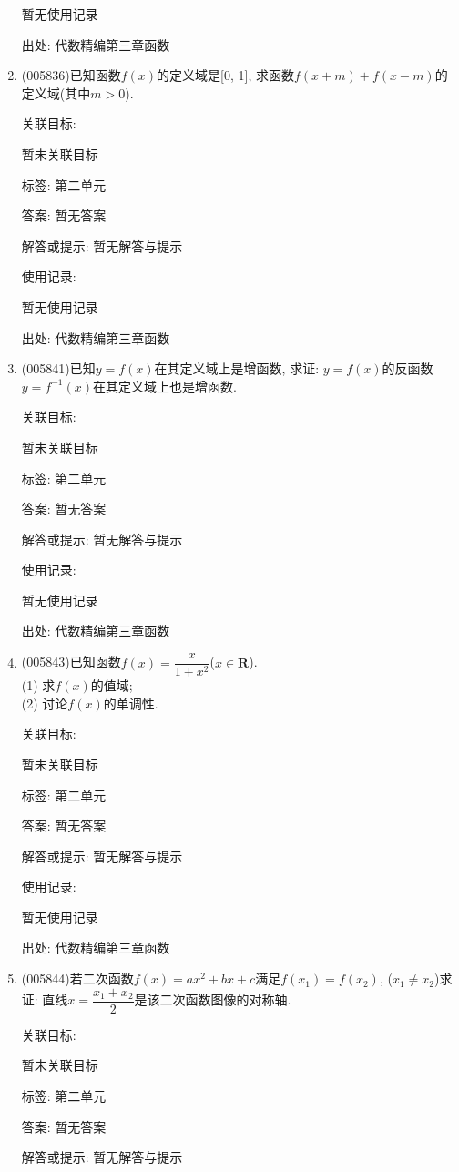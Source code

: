 \documentclass[10pt,a4paper]{article}
\begin{document}
\begin{enumerate}[1.]
暂无使用记录


出处: 代数精编第三章函数
\item { (005836)}已知函数$f(x)$的定义域是[0, 1], 求函数$f(x+m)+f(x-m)$的定义域(其中$m>0$).


关联目标:

暂未关联目标



标签: 第二单元

答案: 暂无答案

解答或提示: 暂无解答与提示

使用记录:

暂无使用记录


出处: 代数精编第三章函数
\item { (005841)}已知$y=f(x)$在其定义域上是增函数, 求证: $y=f(x)$的反函数$y=f^{-1}(x)$在其定义域上也是增函数.


关联目标:

暂未关联目标



标签: 第二单元

答案: 暂无答案

解答或提示: 暂无解答与提示

使用记录:

暂无使用记录


出处: 代数精编第三章函数
\item { (005843)}已知函数$f(x)=\dfrac x{1+x^2}$($x\in \mathbf{R}$).\\
(1) 求$f(x)$的值域;\\
(2) 讨论$f(x)$的单调性.


关联目标:

暂未关联目标



标签: 第二单元

答案: 暂无答案

解答或提示: 暂无解答与提示

使用记录:

暂无使用记录


出处: 代数精编第三章函数
\item { (005844)}若二次函数$f(x)=ax^2+bx+c$满足$f(x_1)=f(x_2)$, ($x_1\ne x_2$)求证: 直线$x=\dfrac{x_1+x_2}2$是该二次函数图像的对称轴.


关联目标:

暂未关联目标



标签: 第二单元

答案: 暂无答案

解答或提示: 暂无解答与提示


\end{enumerate}
\end{document}
